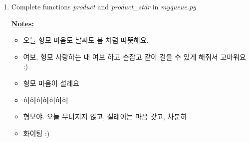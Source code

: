 \documentclass[12pt]{article}
\begin{document}
\begin{enumerate}[1.]
    \item Complete functions \textit{product} and \textit{product\_star} in \textit{myqueue.py}

    \bigskip

    \underline{\textbf{Notes:}}

    \bigskip

    \begin{itemize}
        \item 오늘 형모 마음도 날씨도 봄 처럼 따뜻해요.
        \item 여보, 형모 사랑하는 내 여보 하고 손잡고 같이 걸을 수 있게 해줘서 고마워요 :)
        \item 형모 마음이 설레요
        \item 허허허허허허허
        \item 형모야. 오늘 무너지지 않고, 설레이는 마음 갖고, 차분히
        \item 화이팅 :)
    \end{itemize}

\end{enumerate}
\end{document}
